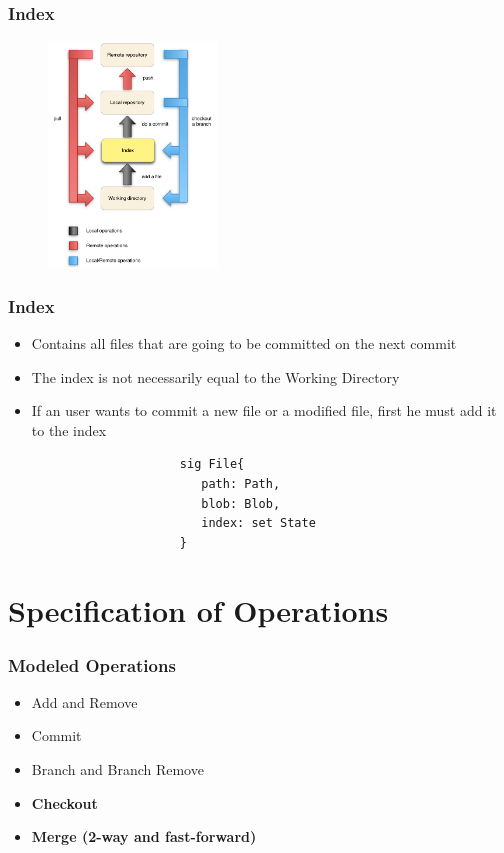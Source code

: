 \documentclass{beamer}
\begin{document}
\begin{frame}
   \frametitle{Index}
   \begin{figure}
      \centering
      \includegraphics[width=0.4\textwidth]{images/workflow1.png}
   \end{figure}
\end{frame}

\begin{frame}[fragile]
   \frametitle{Index}
   \begin{itemize}
      \item Contains all files that are going to be committed on the next
      commit 
      \item The index is not necessarily equal to the Working Directory
      \item If an user wants to commit a new file or a modified file,
      first he must add it to the index
   \end{itemize}
   \vspace{10mm}
   \tiny
   \color{blue}
   \begin{lstlisting}
                        sig File{
                           path: Path,
                           blob: Blob,
                           index: set State
                        }

   \end{lstlisting}

\end{frame}


\section{Specification of Operations}

\begin{frame}[fragile]
   \frametitle{Modeled Operations}
   \begin{itemize}
      \item Add and Remove
      \item Commit
      \item Branch and Branch Remove
      \item {\bf Checkout}
      \item {\bf Merge (2-way and fast-forward) }
   \end{itemize}
\end{frame}
\end{document}
